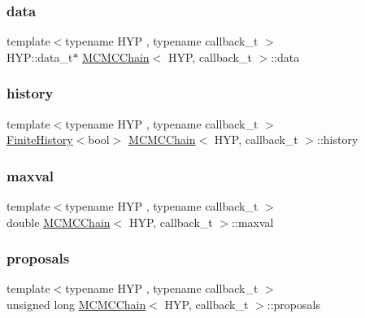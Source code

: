 \mbox{\label{class_m_c_m_c_chain_ab235f08fad93a9626ffb566c001ed5c9}} 
\subsubsection{\texorpdfstring{data}{data}}
{\footnotesize\ttfamily template$<$typename H\+YP , typename callback\+\_\+t $>$ \\
H\+Y\+P\+::data\+\_\+t$\ast$ \hyperlink{class_m_c_m_c_chain}{M\+C\+M\+C\+Chain}$<$ H\+YP, callback\+\_\+t $>$\+::data}

\mbox{\label{class_m_c_m_c_chain_a83cb52eb26bdb914c0eb483f541972a9}} 
\subsubsection{\texorpdfstring{history}{history}}
{\footnotesize\ttfamily template$<$typename H\+YP , typename callback\+\_\+t $>$ \\
\hyperlink{class_finite_history}{Finite\+History}$<$bool$>$ \hyperlink{class_m_c_m_c_chain}{M\+C\+M\+C\+Chain}$<$ H\+YP, callback\+\_\+t $>$\+::history}

\mbox{\label{class_m_c_m_c_chain_a3b8d31f47d75503321b432eeac0bb13b}} 
\subsubsection{\texorpdfstring{maxval}{maxval}}
{\footnotesize\ttfamily template$<$typename H\+YP , typename callback\+\_\+t $>$ \\
double \hyperlink{class_m_c_m_c_chain}{M\+C\+M\+C\+Chain}$<$ H\+YP, callback\+\_\+t $>$\+::maxval}

\mbox{\label{class_m_c_m_c_chain_aec2cdd6a3e25447c7f34e31d0d98dbcb}} 
\subsubsection{\texorpdfstring{proposals}{proposals}}
{\footnotesize\ttfamily template$<$typename H\+YP , typename callback\+\_\+t $>$ \\
unsigned long \hyperlink{class_m_c_m_c_chain}{M\+C\+M\+C\+Chain}$<$ H\+YP, callback\+\_\+t $>$\+::proposals}

